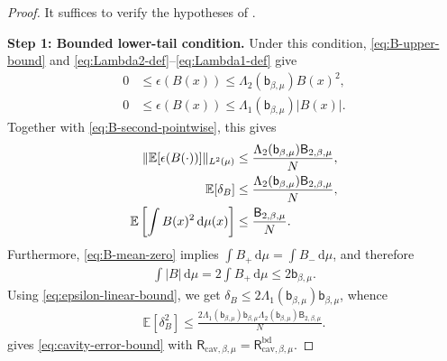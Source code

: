 \documentclass[11pt,reqno]{amsart}
\numberwithin{equation}{section}
\theoremstyle{plain}
\theoremstyle{remark}
\DeclarePairedDelimiter{\norm}{\lVert}{\rVert}
\newcommand{\md}{\mathrm{d}}
\newcommand{\E}{{\mathbb{E}}}
\newcommand{\be}{\beta}
\newcommand{\step}[1]{\par\medskip\noindent\textbf{#1}}
\begin{document}
\begin{proof}
It suffices to verify the hypotheses of .

\step{Step 1: Bounded lower-tail condition.}
Under this condition, \eqref{eq:B-upper-bound} and \eqref{eq:Lambda2-def}--\eqref{eq:Lambda1-def} give
\begin{subequations}\label{eq:epsilon-bounds}
\begin{align}
 0&\le \epsilon(B(x))\le \Lambda_2(\mathsf b_{\be,\mu})B(x)^2,\label{eq:epsilon-quadratic-bound}\\
 0&\le \epsilon(B(x))\le \Lambda_1(\mathsf b_{\be,\mu})|B(x)|.\label{eq:epsilon-linear-bound}
\end{align}
\end{subequations}
Together with \eqref{eq:B-second-pointwise}, this gives
\begin{subequations}\label{eq:bounded-cavity-abstract-inputs}
\begin{align}
 \norm{\E[\epsilon(B(\cdot))]}_{L^2(\mu)}
 &\le \frac{\Lambda_2(\mathsf b_{\be,\mu})\mathsf B_{2,\be,\mu}}{N},\label{eq:bounded-cavity-E}\\
 \E[\delta_B]
 &\le \frac{\Lambda_2(\mathsf b_{\be,\mu})\mathsf B_{2,\be,\mu}}{N},\label{eq:bounded-cavity-D1}\\
 \E\left[\int B(x)^2\,\md\mu(x)\right]
 &\le \frac{\mathsf B_{2,\be,\mu}}{N}.\label{eq:bounded-cavity-B}
\end{align}
\end{subequations}
Furthermore, \eqref{eq:B-mean-zero} implies \(\int B_{+}\,\md\mu=\int B_{-}\,\md\mu\), and therefore
\begin{align}\label{eq:B-L1-bounded-condition}
 \int |B|\,\md\mu=2\int B_+\,\md\mu\le 2\mathsf b_{\be,\mu}.
\end{align}
Using \eqref{eq:epsilon-linear-bound}, we get \(\delta_B\le 2\Lambda_1(\mathsf b_{\be,\mu})\mathsf b_{\be,\mu}\), whence
\begin{align}\label{eq:bounded-cavity-D2}
 \E[\delta_B^2]
 \le
 \frac{2\Lambda_1(\mathsf b_{\be,\mu})\mathsf b_{\be,\mu}
       \Lambda_2(\mathsf b_{\be,\mu})\mathsf B_{2,\be,\mu}}{N}.
\end{align}
 gives \eqref{eq:cavity-error-bound} with \(\mathsf R_{\mathrm{cav},\be,\mu}=\mathsf R_{\mathrm{cav},\be,\mu}^{\mathrm{bd}}\).


\end{proof}
\end{document}

